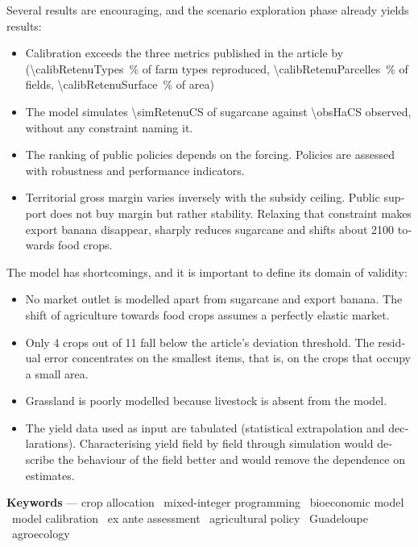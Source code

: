 \begin{otherlanguage}{english}
Several results are encouraging, and the scenario exploration phase already yields results:
\begin{itemize}
\item Calibration exceeds the three metrics published in the article by \parencite{chopin2015}
(\SI{\calibRetenuTypes}{\percent} of farm types reproduced,
\SI{\calibRetenuParcelles}{\percent} of fields, \SI{\calibRetenuSurface}{\percent} of area)
\item The model simulates \SI{\simRetenuCS}{\ha} of sugarcane against \SI{\obsHaCS}{\ha} observed,
without any constraint naming it.
\item The ranking of public policies depends on the forcing. Policies are assessed with robustness
and performance indicators.
\item Territorial gross margin varies inversely with the subsidy ceiling. Public support does not buy
margin but rather stability. Relaxing that constraint makes export banana disappear, sharply
reduces sugarcane and shifts about \SI{2100}{\ha} towards food crops.
\end{itemize}

The model has shortcomings, and it is important to define its domain of validity:
\begin{itemize}
\item No market outlet is modelled apart from sugarcane and export banana. The shift of agriculture
towards food crops assumes a perfectly elastic market.
\item Only 4 crops out of 11 fall below the article's deviation threshold. The residual error
concentrates on the smallest items, that is, on the crops that occupy a small area.
\item Grassland is poorly modelled because livestock is absent from the model.
\item The yield data used as input are tabulated (statistical extrapolation and declarations).
Characterising yield field by field through simulation would describe the behaviour of the field
better and would remove the dependence on estimates.
\end{itemize}

\vfill
\noindent\textbf{Keywords} — crop allocation \textperiodcentered\ mixed-integer programming
\textperiodcentered\ bioeconomic model \textperiodcentered\ model calibration
\textperiodcentered\ ex ante assessment \textperiodcentered\ agricultural policy
\textperiodcentered\ Guadeloupe \textperiodcentered\ agroecology

\end{otherlanguage}
